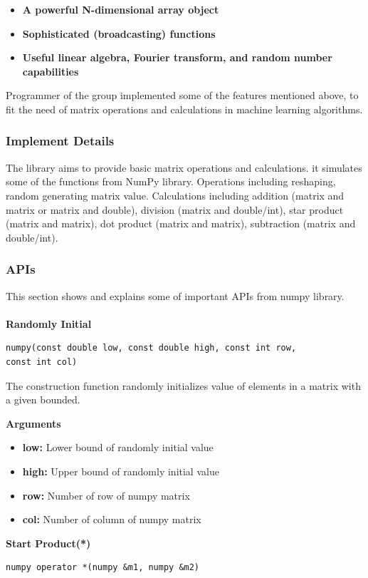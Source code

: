 \documentclass[a4paper]{article}
\begin{document}
\begin{itemize}
	\item{\textbf{A powerful N-dimensional array object}}
    \item{\textbf{Sophisticated (broadcasting) functions} }
    \item{\textbf{Useful linear algebra, Fourier transform, and random number capabilities} }
\end{itemize}

Programmer of the group implemented some of the features mentioned above, to fit the need of matrix operations and calculations in machine learning algorithms.    


\subsubsection{Implement Details}
The library aims to provide basic matrix operations and calculations. it simulates some of the functions from NumPy library. Operations including reshaping, random generating matrix value. Calculations including addition (matrix and matrix or matrix and double), division (matrix and double/int), star product (matrix and matrix), dot product (matrix and matrix), subtraction (matrix and double/int).

\subsubsection{APIs}                                                                    
This section shows and explains some of important APIs from numpy library.\\\\
\textbf{\Large Randomly Initial}\\           
\begin{lstlisting}[language={[ANSI]C++},keywordstyle=\color{blue!70},commentstyle=\color{red!50!green!50!blue!50},frame=shadowbox, rulesepcolor=\color{red!20!green!20!blue!20}]
numpy(const double low, const double high, const int row, 
const int col)
\end{lstlisting}

The construction function randomly initializes value of elements in a matrix with a given bounded.

\textbf{Arguments}
\begin{itemize}
	\item{\textbf{low:} Lower bound of randomly initial value}
    \item{\textbf{high:} Upper bound of randomly initial value}
    \item{\textbf{row:} Number of row of numpy matrix}
    \item{\textbf{col:} Number of column of numpy matrix}
\end{itemize}
\textbf{\Large Start Product(*)}\\
\begin{lstlisting}[language={[ANSI]C++},keywordstyle=\color{blue!70},commentstyle=\color{red!50!green!50!blue!50},frame=shadowbox, rulesepcolor=\color{red!20!green!20!blue!20}]
numpy operator *(numpy &m1, numpy &m2)
\end{lstlisting}
\end{document}
